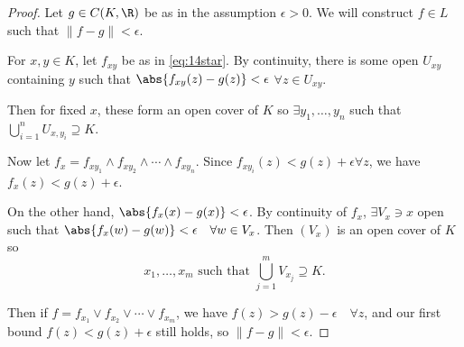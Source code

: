 \documentclass{article}
\begin{document}
\begin{proof}
    Let $g \in C(K, \R)$ be as in the assumption $\epsilon > 0$.
    We will construct $f \in L$ such that $\|f-g\| < \epsilon$.

    For $x, y \in K$, let $f_{xy}$ be as in \eqref{eq:14star}.
    By continuity, there is some open $U_{xy}$ containing $y$ such that $\abs{f_{xy}(z) - g(z)} < \epsilon$ $\forall z \in U_{xy}$.

    Then for fixed $x$, these form an open cover of $K$ so $\exists y_1, \dotsc, y_n$ such that $\bigcup_{i=1}^n U_{x, y_i} \supseteq K$.

    Now let $f_x = f_{xy_1} \wedge f_{xy_2} \wedge \dotsb \wedge f_{xy_n}$.
    Since $f_{xy_i}(z) < g(z) + \epsilon \forall z$, we have $f_x(z) < g(z) + \epsilon$.

    On the other hand, $\abs{f_x(x) - g(x)} < \epsilon$.
    By continuity of $f_x$, $\exists V_x \ni x$ open such that $\abs{f_x(w) - g(w)} < \epsilon \quad \forall w \in V_x$.
    Then $(V_x)$ is an open cover of $K$ so
    \begin{equation*}
        x_1, \dotsc, x_m \text{ such that } \bigcup_{j=1}^m V_{x_j} \supseteq K.
    \end{equation*}

    Then if $f = f_{x_1} \vee f_{x_2} \vee \dotsb \vee f_{x_m}$, we have $f(z) > g(z) - \epsilon \quad \forall z$, and our first bound $f(z) < g(z) + \epsilon$ still holds, so $\|f - g\| < \epsilon$. %
\end{proof}
\end{document}
